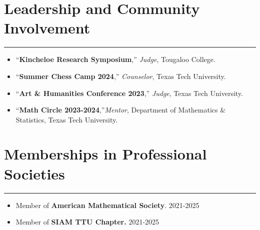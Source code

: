 \documentclass[12pt]{book}
\begin{document}
 \section*{Leadership and Community Involvement}
\rule{\textwidth}{1pt}
\begin{itemize}
	\item ``\textbf{Kincheloe Research Symposium},'' \textit{Judge}, Tougaloo College. 
	\item ``\textbf{Summer Chess Camp 2024},'' \textit{Counselor}, Texas Tech University. 
	\item ``\textbf{Art \& Humanities Conference 2023},'' \textit{Judge}, Texas Tech University.  
	\item ``\textbf{Math Circle 2023-2024},''\textit{Mentor}, Department of Mathematics \& Statistics, Texas Tech University. 
\end{itemize}





\section*{Memberships in Professional Societies}
 \rule{\textwidth}{1pt}
 \begin{itemize}
 	\item Member of \textbf{American Mathematical Society}. \hfill  2021-2025
	\item Member of \textbf{SIAM TTU Chapter.} \hfill 2021-2025
 \end{itemize}
\end{document}
